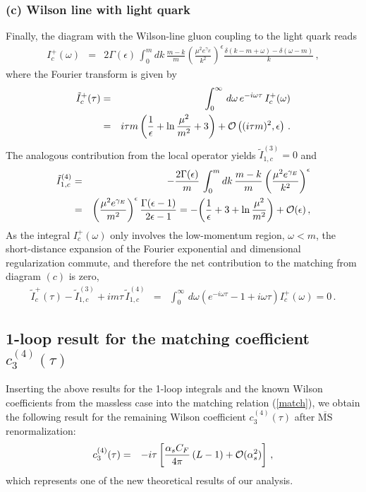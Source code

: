 \documentclass[a4paper,11pt]{article}
\begin{document}
\subsubsection*{(c) Wilson line with light quark}


Finally, the diagram with the Wilson-line gluon coupling to the light quark reads
\cite{Bell:2008er}
\begin{eqnarray}
	I_c^+(\omega)&=& 2 \Gamma(\epsilon) \, \int_0^m dk \, \frac{m-k}{m} \left(\frac{\mu^2 e^{\gamma_E}}{k^2}\right)^\epsilon \frac{\delta(k-m+\omega)-\delta(\omega-m)}{k} \,,
\end{eqnarray}
where the Fourier transform is given by
\begin{eqnarray}
		\tilde I_c^+(\tau)  &=& 
  \int_0^\infty \, d\omega \,  e^{-i\omega\tau} \,  I_c^+(\omega)
  \cr 
	&=& i\tau m \left( \frac{1}{\epsilon} + \ln \frac{\mu^2}{m^2} + 3  \right) + {\cal O}\left( (i\tau m)^2,\epsilon\right) \,.
\end{eqnarray}
The analogous contribution from the local operator yields $\tilde I_{1,c}^{(3)} = 0$ and
\begin{eqnarray}
	\tilde I_{1,c}^{(4)} &=& - \frac{2 \Gamma(\epsilon)}{m} \, \int_0^m dk \, \frac{m-k}{m} \left(\frac{\mu^2 e^{\gamma_E}}{k^2}\right)^\epsilon \cr
    &=& \left(\frac{\mu^2 e^{\gamma_E}}{m^2}\right)^\epsilon
        \frac{\Gamma(\epsilon - 1)}{2 \epsilon - 1}
    = - \bigg(\frac{1}{\epsilon} + 3 + \ln \frac{\mu^2}{m^2}\bigg) + {\cal O}(\epsilon)  \,,
\end{eqnarray}
%
As the integral $I_c^+(\omega)$ only involves the low-momentum region, $\omega <m$, the 
short-distance expansion of the Fourier exponential and dimensional regularization commute, 
and therefore the net contribution to the matching from diagram $(c)$ is zero,
\begin{eqnarray}
    \tilde I_c^+(\tau) - \tilde I_{1,c}^{(3)} + im\tau \, \tilde I_{1,c}^{(4)} &=& 
  \int_0^\infty \, d\omega \left( e^{-i\omega\tau} - 1 + i \omega \tau  \right)  I_c^+(\omega) =0
  \,.
\end{eqnarray}



\subsection{1-loop result for the matching coefficient \texorpdfstring{$c_3^{(4)}(\tau)$}{c34}}

Inserting the above results for the 1-loop integrals and the known Wilson coefficients from the massless case into the matching relation (\ref{match}), we obtain the following result for the remaining Wilson coefficient $c_3^{(4)}(\tau)$ after $\overline{\mathrm{MS}}$ renormalization:
\begin{eqnarray}
    c_3^{(4)}(\tau) &=& -i \tau \left[ \frac{\alpha_s C_F}{4\pi} \left( L -1 \right) + {\cal O}(\alpha_s^2) \right] \,,
    \label{eq:c34plus}
\end{eqnarray}
which represents one of the new theoretical results of our analysis.
\end{document}
